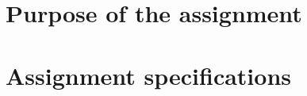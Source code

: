 \documentclass{report}
\begin{document}
	\section{Purpose of the assignment}\label{purpose}
	
	
	
	\section{Assignment specifications}\label{specifications}
	
	
	
\end{document}
